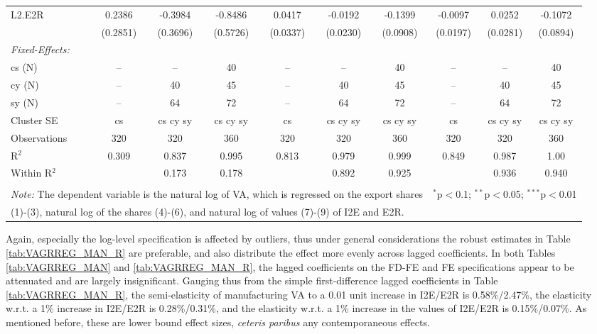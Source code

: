 \documentclass[a4paper]{article}
\begin{document}
\begin{table}[h!]
{\begin{tabular}[t]{lccccccccc}
L2.E2R&0.2386 & -0.3984 & -0.8486 & 0.0417 & -0.0192 & -0.1399 & -0.0097 & 0.0252 & -0.1072\\
  &(0.2851) & (0.3696) & (0.5726) & (0.0337) & (0.0230) & (0.0908) & (0.0197) & (0.0281) & (0.0894)\\%
\midrule \emph{Fixed-Effects:} &   &   &   &   &   &  \\
cs (N) & -- & -- & 40 & -- & -- & 40 & -- & -- & 40\\
cy (N) & -- & 40 & 45 & -- & 40 & 45 & -- & 40 & 45\\
sy (N) & -- & 64 & 72 & -- & 64 & 72 & -- & 64 & 72\\
\midrule
Cluster SE & cs & cs cy sy & cs cy sy & cs & cs cy sy & cs cy sy & cs & cs cy sy & cs cy sy\\
Observations & 320&320&360&320&320&360&320&320&360\\
R$^2$ & 0.309&0.837&0.995&0.813&0.979&0.999&0.849&0.987&1.00\\
Within R$^2$ & &0.173&0.178&&0.892&0.925&&0.936&0.940\\ \bottomrule \\[-1em]
\multicolumn{7}{l}{\small \textit{Note:} The dependent variable is the natural log of VA, which is regressed on the  export shares}   & \multicolumn{3}{r}{$^{*}$p$<$0.1; $^{**}$p$<$0.05; $^{***}$p$<$0.01} \\ [-0.2em]
\multicolumn{10}{l}{\small \quad \quad \quad (1)-(3), natural log of the shares (4)-(6), and natural log of values (7)-(9) of I2E and E2R.} \\
\end{tabular}
}
\end{table}
\FloatBarrier



Again, especially the log-level specification is affected by outliers, thus under general considerations the robust estimates in Table \ref{tab:VAGRREG_MAN_R} are preferable, and also distribute the effect more evenly across lagged coefficients. In both Tables \ref{tab:VAGRREG_MAN} and \ref{tab:VAGRREG_MAN_R}, the lagged coefficients on the FD-FE and FE specifications appear to be attenuated and are largely insignificant. Gauging thus from the simple first-difference lagged coefficients in  Table \ref{tab:VAGRREG_MAN_R}, the semi-elasticity of manufacturing VA to a 0.01 unit increase in I2E/E2R is 0.58\%/2.47\%, the elasticity w.r.t. a 1\% increase in I2E/E2R is 0.28\%/0.31\%, and the elasticity w.r.t. a 1\% increase in the values of I2E/E2R is 0.15\%/0.07\%. As mentioned before, these are lower bound effect sizes, \textit{ceteris paribus} any contemporaneous effects. %
\end{document}
